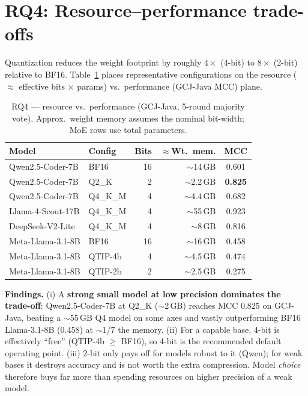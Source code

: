\documentclass[11pt]{article}
\newcommand{\best}[1]{\textbf{#1}}
\begin{document}
\section{RQ4: Resource--performance trade-offs}
Quantization reduces the weight footprint by roughly $4\times$ (4-bit) to
$8\times$ (2-bit) relative to BF16. Table~\ref{tab:rq4} places representative
configurations on the resource ($\approx$ effective bits $\times$ params) vs.\
performance (GCJ-Java MCC) plane.

\begin{table}[htbp]
  \centering
  \caption{RQ4 --- resource vs.\ performance (GCJ-Java, 5-round majority vote).
           Approx.\ weight memory assumes the nominal bit-width; MoE rows use
           total parameters.}
  \label{tab:rq4}
  \small
  \begin{tabular}{llrrc}
    \toprule
    \textbf{Model} & \textbf{Config} & \textbf{Bits} & \textbf{$\approx$Wt.\ mem.} & \textbf{MCC} \\
    \midrule
    Qwen2.5-Coder-7B   & BF16       & 16 & $\sim$14\,GB & 0.601 \\
    Qwen2.5-Coder-7B   & Q2\_K      &  2 & $\sim$2.2\,GB & \best{0.825} \\
    Qwen2.5-Coder-7B   & Q4\_K\_M   &  4 & $\sim$4.4\,GB & 0.682 \\
    \midrule
    Llama-4-Scout-17B  & Q4\_K\_M   &  4 & $\sim$55\,GB & 0.923 \\
    DeepSeek-V2-Lite   & Q4\_K\_M   &  4 & $\sim$8\,GB  & 0.816 \\
    \midrule
    Meta-Llama-3.1-8B  & BF16       & 16 & $\sim$16\,GB & 0.458 \\
    Meta-Llama-3.1-8B  & QTIP-4b    &  4 & $\sim$4.5\,GB & 0.474 \\
    Meta-Llama-3.1-8B  & QTIP-2b    &  2 & $\sim$2.5\,GB & 0.275 \\
    \bottomrule
  \end{tabular}
\end{table}

\noindent\textbf{Findings.} (i) A \textbf{strong small model at low precision
dominates the trade-off}: Qwen2.5-Coder-7B at Q2\_K ($\sim$2\,GB) reaches MCC
$0.825$ on GCJ-Java, beating a $\sim$55\,GB Q4 model on some axes and vastly
outperforming BF16 Llama-3.1-8B ($0.458$) at $\sim$1/7 the memory. (ii) For a
capable base, 4-bit is effectively ``free'' (QTIP-4b $\ge$ BF16), so 4-bit is
the recommended default operating point. (iii) 2-bit only pays off for models
robust to it (Qwen); for weak bases it destroys accuracy and is not worth the
extra compression. Model \emph{choice} therefore buys far more than spending
resources on higher precision of a weak model.
\end{document}
